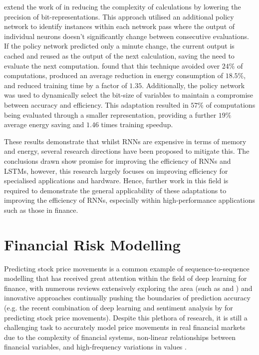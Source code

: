 \documentclass[a4paper, 11pt]{report}
\begin{document}
    \citet{feliz-2021} extend the work of \citet{chen-2022} in reducing the complexity of calculations by lowering the precision of bit-representations. This approach utilised an additional policy network to identify instances within each network pass where the output of individual neurons doesn't significantly change between consecutive evaluations. If the policy network predicted only a minute change, the current output is cached and reused as the output of the next calculation, saving the need to evaluate the next computation. \citet{feliz-2021} found that this technique avoided over $24\%$ of computations, produced an average reduction in energy consumption of $18.5\%$, and reduced training time by a factor of $1.35$. Additionally, the policy network was used to dynamically select the bit-size of variables to maintain a compromise between accuracy and efficiency. This adaptation resulted in $57\%$ of computations being evaluated through a smaller representation, providing a further $19\%$ average energy saving and $1.46$ times training speedup.

    These results demonstrate that whilst RNNs are expensive in terms of memory and energy, several research directions have been proposed to mitigate this. The conclusions drawn show promise for improving the efficiency of RNNs and LSTMs, however, this research largely focuses on improving efficiency for specialised applications and hardware. Hence, further work in this field is required to demonstrate the general applicability of these adaptations to improving the efficiency of RNNs, especially within high-performance applications such as those in finance.


    \section{Financial Risk Modelling}

    Predicting stock price movements is a common example of sequence-to-sequence modelling that has received great attention within the field of deep learning for finance, with numerous reviews extensively exploring the area (such as \citet{sezer-2019} and \citet{jiang-2021}) and innovative approaches continually pushing the boundaries of prediction accuracy (e.g. the recent combination of deep learning and sentiment analysis by \citet{darapaneni-2022} for predicting stock price movements). Despite this plethora of research, it is still a challenging task to accurately model price movements in real financial markets due to the complexity of financial systems, non-linear relationships between financial variables, and high-frequency variations in values \citep{timmermann-2004}.
\end{document}
